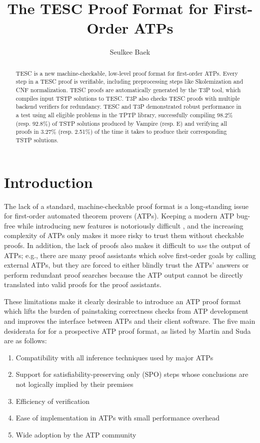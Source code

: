 \documentclass[12pt]{article}
\title{The TESC Proof Format for First-Order ATPs}
\author{Seulkee Baek}
\date{}
\affil{Department of Philosophy, Carnegie Mellon University}
\affil{\textit{seulkeeb@andrew.cmu.edu}}
\begin{document}
\maketitle

\begin{abstract}
TESC is a new machine-checkable, low-level proof format for first-order ATPs. 
Every step in a TESC proof is verifiable, including preprocessing steps like 
Skolemization and CNF normalization. TESC proofs are automatically generated
by the T3P tool, which compiles input TSTP solutions to TESC. T3P also checks 
TESC proofs with multiple backend verifiers for redundancy. TESC and T3P demonstrated
robust performance in a test using all eligible problems in the TPTP library,
successfully compiling 98.2\% (resp. 92.8\%) of TSTP solutions produced by 
Vampire (resp. E) and verifying all proofs in 3.27\% (resp. 2.51\%) of the 
time it takes to produce their corresponding TSTP solutions.
\end{abstract}

\section{Introduction}

The lack of a standard, machine-checkable proof format is a long-standing issue 
for first-order automated theorem provers (ATPs). Keeping a modern ATP bug-free 
while introducing new features is notoriously difficult \cite{reger2017testing}, 
and the increasing complexity of ATPs only makes it more risky to trust them 
without checkable proofs. In addition, the lack of proofs also makes it difficult 
to \textit{use} the output of ATPs; e.g., there are many proof assistants which 
solve first-order goals by calling external ATPs, but they are forced to either 
blindly trust the ATPs' answers \cite{grewe2015using} or perform redundant proof 
searches \cite{bohme2010sledgehammer} because the ATP output cannot be directly 
translated into valid proofs for the proof assistants. 

These limitations make it clearly desirable to introduce an ATP proof format  
which lifts the burden of painstaking correctness checks from ATP development 
and improves the interface between ATPs and their client software. The five main
desiderata for for a prospective ATP proof format, as listed by Martin and Suda \cite{reger2017checkable}
are as follows:
\begin{enumerate}
  \item Compatibility with all inference techniques used by major ATPs
  \item Support for satisfiability-preserving only (SPO) steps whose conclusions are not logically implied by their premises
  \item Efficiency of verification
  \item Ease of implementation in ATPs with small performance overhead
  \item Wide adoption by the ATP community
\end{enumerate}
\end{document}
